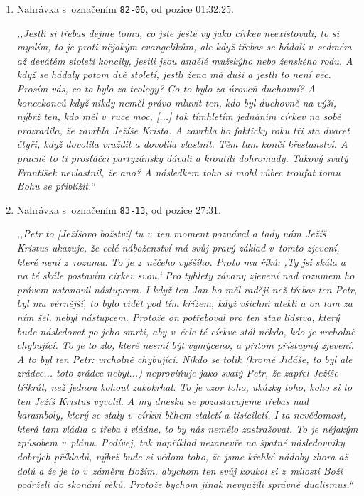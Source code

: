 \begin{enumerate}

\item{
Nahrávka s~označením \texttt{82-06}, od pozice 01:32:25.

\textit{%
,,Jestli si třebas dejme tomu, co jste ještě vy jako církev neexistovali, to si
myslím, to je proti nějakým evangelíkům, ale když třebas se hádali v~sedmém až
devátém století koncily, jestli jsou andělé mužskýho nebo ženského rodu. A když
se hádaly potom dvě století, jestli žena má duši a jestli to není věc. Prosím
vás, co to bylo za teology? Co to bylo za úroveň duchovní? A koneckonců když
nikdy neměl právo mluvit ten, kdo byl duchovně na výši, nýbrž ten, kdo měl
v~ruce moc, [...] tak tímhletím jednáním církev na sobě prozradila,
že zavrhla Ježíše Krista. A zavrhla ho fakticky roku tři sta dvacet čtyři, když
dovolila vraždit a dovolila vlastnit. Těm tam končí křesťanství. A pracně to ti
prosťáčci partyzánsky dávali a kroutili dohromady. Takový svatý František
nevlastnil, že ano? A následkem toho si mohl vůbec troufat tomu Bohu se
přiblížit.``
}
}

\item{
Nahrávka s~označením \texttt{83-13}, od pozice 27:31.

\textit{%
,,Petr to [Ježíšovo božství] tu v~ten moment poznával a tady nám Ježíš Kristus ukazuje, že celé
náboženství má svůj pravý základ v~tomto zjevení, které není z~rozumu. To je
z~něčeho vyššího. Proto mu říká: ,Ty jsi skála a na té skále postavím církev
svou.` Pro tyhlety závany zjevení nad rozumem ho právem ustanovil nástupcem. I
když ten Jan ho měl raději než třebas ten Petr, byl mu věrnější, to bylo vidět
pod tím křížem, když všichni utekli a on tam za ním šel, nebyl nástupcem.
Protože on potřeboval pro ten stav lidstva, který bude následovat po jeho smrti,
aby v~čele té církve stál někdo, kdo je vrcholně chybující. To je to zlo, které
nesmí být vymýceno, a přitom přístupný zjevení. A to byl ten Petr: vrcholně
chybující. Nikdo se tolik (kromě Jidáše, to byl ale zrádce... toto zrádce
nebyl...) neproviňuje jako svatý Petr, že zapřel Ježíše třikrát, než jednou
kohout zakokrhal. To je vzor toho, ukázky toho, koho si to ten Ježíš Kristus
vyvolil. A my dneska se pozastavujeme třebas nad karamboly, který se staly
v~církvi během staletí a tisíciletí. I ta nevědomost, která tam vládla a třeba i
vládne, to by nás nemělo zastrašovat. To je nějakým způsobem v~plánu. Podívej,
tak například nezanevře na špatné následovníky dobrých příkladů, nýbrž bude si
vědom toho, že jsme křehké nádoby zhora až dolů a že je to v~záměru Božím,
abychom ten svůj koukol si z~milosti Boží podrželi do skonání věků. Protože
bychom jinak nevyužili správně dualismus.``
}
}

\end{enumerate}

